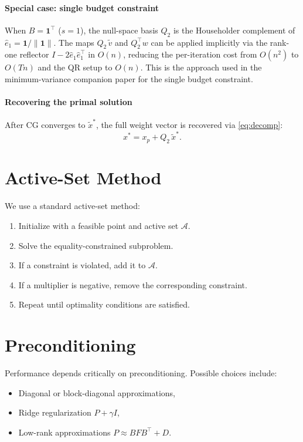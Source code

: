 \documentclass[11pt]{article}
\begin{document}
\paragraph{Special case: single budget constraint}
When $B = \mathbf{1}^\top$ ($s = 1$), the null-space basis $Q_2$ is the Householder
complement of $\hat{e}_1 = \mathbf{1}/\|\mathbf{1}\|$. The maps $Q_2\,\tilde{v}$ and
$Q_2^\top w$ can be applied implicitly via the rank-one reflector
$I - 2\hat{e}_1\hat{e}_1^\top$ in $O(n)$, reducing the per-iteration cost from
$O(n^2)$ to $O(Tn)$ and the QR setup to $O(n)$. This is the approach used in the
minimum-variance companion paper for the single budget constraint.

\paragraph{Recovering the primal solution}
After CG converges to $\tilde{x}^*$, the full weight vector is recovered via
\eqref{eq:decomp}:
\[
x^* = x_p + Q_2\,\tilde{x}^*.
\]

\section{Active-Set Method}

We use a standard active-set method:
\begin{enumerate}
\item Initialize with a feasible point and active set \(\mathcal{A}\).
\item Solve the equality-constrained subproblem.
\item If a constraint is violated, add it to \(\mathcal{A}\).
\item If a multiplier is negative, remove the corresponding constraint.
\item Repeat until optimality conditions are satisfied.
\end{enumerate}

\section{Preconditioning}

Performance depends critically on preconditioning. Possible choices include:
\begin{itemize}
\item Diagonal or block-diagonal approximations,
\item Ridge regularization \(P + \gamma I\),
\item Low-rank approximations \(P \approx B F B^\top + D\).
\end{itemize}
\end{document}
